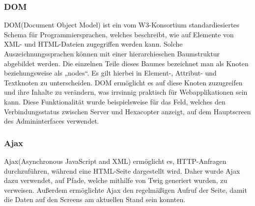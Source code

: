    \subsubsection{DOM}

{DOM\cite{dom}}(Document Object Model) ist ein vom W3-Konsortium standardiesiertes Schema für Programmiersprachen, welches beschreibt, wie auf Elemente von XML- und HTML-Dateien zugegriffen werden kann. Solche Auszeichnungssprachen können mit einer hierarchieschen Baumstruktur abgebildet werden. Die einzelnen Teile dieses Baumes bezeichnet man als Knoten beziehungsweise als „nodes“.  Es gilt hierbei in Element-, Attribut- und Textknoten zu unterscheiden. DOM ermöglicht es auf diese Knoten zuzugreifen und ihre Inhalte zu verändern, was irrsinnig praktisch für Webapplikationen sein kann. Diese Funktionalität wurde beispielsweise für das Feld, welches den Verbindungsstatus zwischen Server und Hexacopter anzeigt, auf dem Hauptscreen des Admininterfaces verwendet.

    \subsubsection{Ajax}

{Ajax\cite{ajax}}(Asynchronous JavaScript and XML) ermöglicht es, HTTP-Anfragen durchzuführen, während eine HTML-Seite dargestellt wird. Daher wurde Ajax dazu verwendet, auf Pfade, welche mithilfe von Twig generiert wurden, zu verweisen. Außerdem ermöglichte Ajax den regelmäßigen Aufruf der Seite, damit die  Daten auf den Screens am aktuellen Stand sein konnten.

